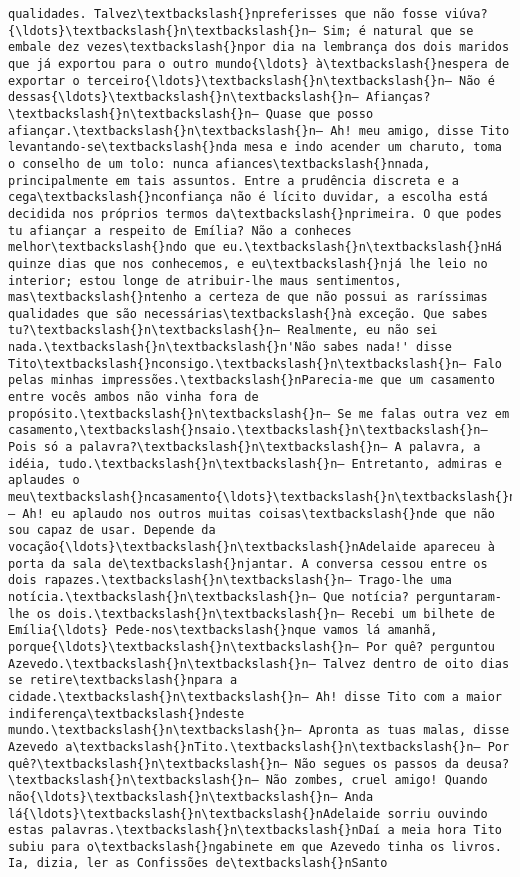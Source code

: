 \documentclass[11pt]{article}
\begin{document}
\begin{Verbatim}[commandchars=\\\{\}]
qualidades. Talvez\textbackslash{}npreferisses que não fosse viúva?{\ldots}\textbackslash{}n\textbackslash{}n— Sim; é natural que se embale dez vezes\textbackslash{}npor dia na lembrança dos dois maridos que já exportou para o outro mundo{\ldots} à\textbackslash{}nespera de exportar o terceiro{\ldots}\textbackslash{}n\textbackslash{}n— Não é dessas{\ldots}\textbackslash{}n\textbackslash{}n— Afianças?\textbackslash{}n\textbackslash{}n— Quase que posso afiançar.\textbackslash{}n\textbackslash{}n— Ah! meu amigo, disse Tito levantando-se\textbackslash{}nda mesa e indo acender um charuto, toma o conselho de um tolo: nunca afiances\textbackslash{}nnada, principalmente em tais assuntos. Entre a prudência discreta e a cega\textbackslash{}nconfiança não é lícito duvidar, a escolha está decidida nos próprios termos da\textbackslash{}nprimeira. O que podes tu afiançar a respeito de Emília? Não a conheces melhor\textbackslash{}ndo que eu.\textbackslash{}n\textbackslash{}nHá quinze dias que nos conhecemos, e eu\textbackslash{}njá lhe leio no interior; estou longe de atribuir-lhe maus sentimentos, mas\textbackslash{}ntenho a certeza de que não possui as raríssimas qualidades que são necessárias\textbackslash{}nà exceção. Que sabes tu?\textbackslash{}n\textbackslash{}n— Realmente, eu não sei nada.\textbackslash{}n\textbackslash{}n'Não sabes nada!' disse Tito\textbackslash{}nconsigo.\textbackslash{}n\textbackslash{}n— Falo pelas minhas impressões.\textbackslash{}nParecia-me que um casamento entre vocês ambos não vinha fora de propósito.\textbackslash{}n\textbackslash{}n— Se me falas outra vez em casamento,\textbackslash{}nsaio.\textbackslash{}n\textbackslash{}n— Pois só a palavra?\textbackslash{}n\textbackslash{}n— A palavra, a idéia, tudo.\textbackslash{}n\textbackslash{}n— Entretanto, admiras e aplaudes o meu\textbackslash{}ncasamento{\ldots}\textbackslash{}n\textbackslash{}n— Ah! eu aplaudo nos outros muitas coisas\textbackslash{}nde que não sou capaz de usar. Depende da vocação{\ldots}\textbackslash{}n\textbackslash{}nAdelaide apareceu à porta da sala de\textbackslash{}njantar. A conversa cessou entre os dois rapazes.\textbackslash{}n\textbackslash{}n— Trago-lhe uma notícia.\textbackslash{}n\textbackslash{}n— Que notícia? perguntaram-lhe os dois.\textbackslash{}n\textbackslash{}n— Recebi um bilhete de Emília{\ldots} Pede-nos\textbackslash{}nque vamos lá amanhã, porque{\ldots}\textbackslash{}n\textbackslash{}n— Por quê? perguntou Azevedo.\textbackslash{}n\textbackslash{}n— Talvez dentro de oito dias se retire\textbackslash{}npara a cidade.\textbackslash{}n\textbackslash{}n— Ah! disse Tito com a maior indiferença\textbackslash{}ndeste mundo.\textbackslash{}n\textbackslash{}n— Apronta as tuas malas, disse Azevedo a\textbackslash{}nTito.\textbackslash{}n\textbackslash{}n— Por quê?\textbackslash{}n\textbackslash{}n— Não segues os passos da deusa?\textbackslash{}n\textbackslash{}n— Não zombes, cruel amigo! Quando não{\ldots}\textbackslash{}n\textbackslash{}n— Anda lá{\ldots}\textbackslash{}n\textbackslash{}nAdelaide sorriu ouvindo estas palavras.\textbackslash{}n\textbackslash{}nDaí a meia hora Tito subiu para o\textbackslash{}ngabinete em que Azevedo tinha os livros. Ia, dizia, ler as Confissões de\textbackslash{}nSanto 
\end{Verbatim}
\end{document}
